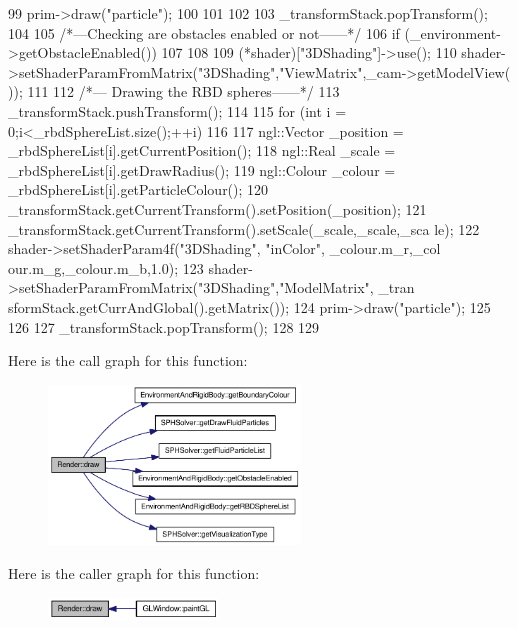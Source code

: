 \begin{DoxyCode}
{{{{99                 prim->draw("particle");
100             }
101 
102         }
103         _transformStack.popTransform();
104     }
105     /*---Checking are obstacles enabled or not------*/
106     if (_environment->getObstacleEnabled())
107     {
108 
109     (*shader)["3DShading"]->use();
110     shader->setShaderParamFromMatrix("3DShading","ViewMatrix",_cam->getModelView(
      ));
111 
112         /*--- Drawing the RBD spheres------*/
113         _transformStack.pushTransform();
114         {
115             for (int i = 0;i<_rbdSphereList.size();++i)
116             {
117                 ngl::Vector _position = _rbdSphereList[i].getCurrentPosition();
118                 ngl::Real _scale = _rbdSphereList[i].getDrawRadius();
119                 ngl::Colour _colour = _rbdSphereList[i].getParticleColour();
120                 _transformStack.getCurrentTransform().setPosition(_position);
121                 _transformStack.getCurrentTransform().setScale(_scale,_scale,_sca
      le);
122                 shader->setShaderParam4f("3DShading", "inColor", _colour.m_r,_col
      our.m_g,_colour.m_b,1.0);
123                 shader->setShaderParamFromMatrix("3DShading","ModelMatrix", _tran
      sformStack.getCurrAndGlobal().getMatrix());
124                 prim->draw("particle");
125             }
126         }
127         _transformStack.popTransform();
128     }
129 }
\end{DoxyCode}




Here is the call graph for this function:\nopagebreak
\begin{figure}[H]
\begin{center}
\leavevmode
\includegraphics[width=190pt]{class_render_abff096b6a70647c4e22272f51df53417_cgraph}
\end{center}
\end{figure}




Here is the caller graph for this function:\nopagebreak
\begin{figure}[H]
\begin{center}
\leavevmode
\includegraphics[width=128pt]{class_render_abff096b6a70647c4e22272f51df53417_icgraph}
\end{center}
\end{figure}


